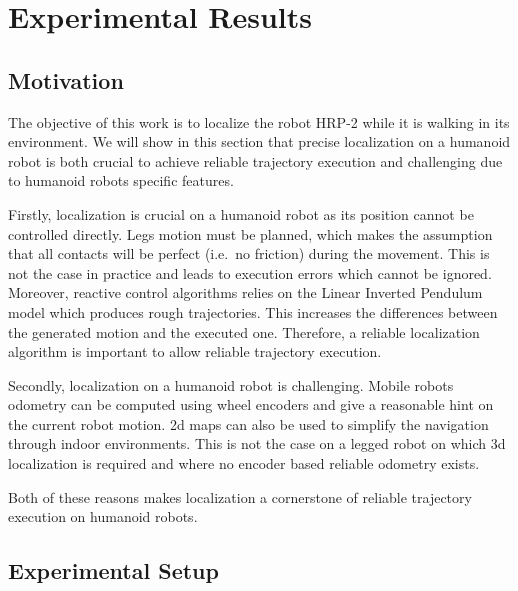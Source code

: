 \section{Experimental Results}\label{sec:results}

\subsection{Motivation}\label{sec:motivation}

The objective of this work is to localize the robot HRP-2 while it is
walking in its environment. We will show in this section that precise
localization on a humanoid robot is both crucial to achieve reliable
trajectory execution and challenging due to humanoid robots specific
features.


Firstly, localization is crucial on a humanoid robot as its position
cannot be controlled directly. Legs motion must be planned, which
makes the assumption that all contacts will be perfect (i.e.\ no
friction) during the movement. This is not the case in practice and
leads to execution errors which cannot be ignored. Moreover, reactive
control algorithms relies on the Linear Inverted Pendulum model which
produces rough trajectories. This increases the differences between
the generated motion and the executed one. Therefore, a reliable
localization algorithm is important to allow reliable trajectory
execution.


Secondly, localization on a humanoid robot is challenging. Mobile
robots odometry can be computed using wheel encoders and give a
reasonable hint on the current robot motion. 2d maps can also be used
to simplify the navigation through indoor environments. This is not
the case on a legged robot on which 3d localization is required and
where no encoder based reliable odometry exists.


Both of these reasons makes localization a cornerstone of reliable
trajectory execution on humanoid robots.


\subsection{Experimental Setup}\label{sec:xp_setup}



